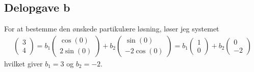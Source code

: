 \documentclass[12pt]{article}
\begin{document}
\subsection{Delopgave b}

For at bestemme den ønskede partikulære løsning, løser jeg systemet
\begin{align}
\begin{pmatrix}
3 \\ 4
\end{pmatrix} = b_1 \begin{pmatrix}
\cos(0) \\ 2\sin(0)
\end{pmatrix} + b_2 \begin{pmatrix}
\sin(0) \\ -2\cos(0)
\end{pmatrix} = b_1 \begin{pmatrix}
1 \\ 0
\end{pmatrix} + b_2 \begin{pmatrix}
0 \\ -2
\end{pmatrix}
\end{align}
hvilket giver $b_1=3$ og $b_2=-2$.
\end{document}
